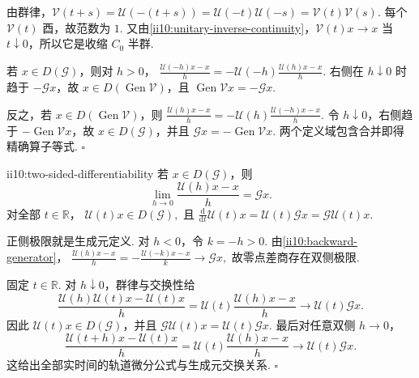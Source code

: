 \begin{FAProof}
由群律，\(\displaystyle\mathcal V(t+s)=\mathcal U(-(t+s))=\mathcal U(-t)\mathcal U(-s)=\mathcal V(t)\mathcal V(s)\). 每个 \(\displaystyle\mathcal V(t)\) 酉，故范数为 \(\displaystyle1\). 又由\autoref{ii10:unitary-inverse-continuity}，\(\displaystyle\mathcal V(t)x\to x\) 当 \(\displaystyle t\downarrow0\)，所以它是收缩 \(\displaystyle C_0\) 半群.

若 \(\displaystyle x\in D(\mathcal G)\)，则对 \(\displaystyle h>0\)， \(\displaystyle \frac{\mathcal U(-h)x-x}{h} = -\mathcal U(-h) \frac{\mathcal U(h)x-x}{h}.\)
右侧在 \(\displaystyle h\downarrow0\) 时趋于 \(\displaystyle-\mathcal Gx\)，故 \(\displaystyle x\in D(\operatorname{Gen}\mathcal V)\)，且 \(\displaystyle\operatorname{Gen}\mathcal Vx=-\mathcal Gx\).

反之，若 \(\displaystyle x\in D(\operatorname{Gen}\mathcal V)\)，则 \(\displaystyle \frac{\mathcal U(h)x-x}{h} = -\mathcal U(h) \frac{\mathcal U(-h)x-x}{h}.\)
令 \(\displaystyle h\downarrow0\)，右侧趋于 \(\displaystyle-\operatorname{Gen}\mathcal Vx\)，故 \(\displaystyle x\in D(\mathcal G)\)，并且 \(\displaystyle\mathcal Gx=-\operatorname{Gen}\mathcal Vx\). 两个定义域包含合并即得精确算子等式.
\hfill\(\square\)
\end{FAProof}

\begin{FAProposition}[B][双侧轨道微分与生成元交换]{ii10:two-sided-differentiability}
若 \(\displaystyle x\in D(\mathcal G)\)，则
\[
\lim_{h\to0}
\frac{\mathcal U(h)x-x}{h}
=
\mathcal Gx.
\]
对全部 \(\displaystyle t\in\mathbb R\)， \(\displaystyle \mathcal U(t)x\in D(\mathcal G),\)
且 \(\displaystyle \frac{\mathrm{d}}{\mathrm{d}t}\mathcal U(t)x = \mathcal U(t)\mathcal Gx = \mathcal G\mathcal U(t)x.\)
\end{FAProposition}

\begin{FAProof}
正侧极限就是生成元定义. 对 \(\displaystyle h<0\)，令 \(\displaystyle k=-h>0\). 由\autoref{ii10:backward-generator}， \(\displaystyle \frac{\mathcal U(h)x-x}{h} = -\frac{\mathcal U(-k)x-x}{k} \longrightarrow \mathcal Gx,\)
故零点差商存在双侧极限.

固定 \(\displaystyle t\in\mathbb R\). 对 \(\displaystyle h\downarrow0\)，群律与交换性给
\[
\frac{\mathcal U(h)\mathcal U(t)x-\mathcal U(t)x}{h}
=
\mathcal U(t)
\frac{\mathcal U(h)x-x}{h}
\longrightarrow
\mathcal U(t)\mathcal Gx.
\]
因此 \(\displaystyle\mathcal U(t)x\in D(\mathcal G)\)，并且 \(\displaystyle \mathcal G\mathcal U(t)x=\mathcal U(t)\mathcal Gx.\)
最后对任意双侧 \(\displaystyle h\to0\)，
\[
\frac{\mathcal U(t+h)x-\mathcal U(t)x}{h}
=
\mathcal U(t)
\frac{\mathcal U(h)x-x}{h}
\longrightarrow
\mathcal U(t)\mathcal Gx.
\]
这给出全部实时间的轨道微分公式与生成元交换关系.
\hfill\(\square\)
\end{FAProof}

